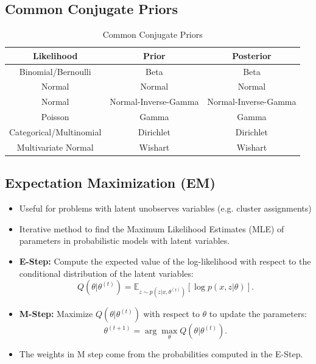 \documentclass[12pt,a4paper]{article}
\begin{document}
\subsection{Common Conjugate Priors}
\begin{table}[h!]
    \centering
    \begin{tabular}{c|c|c}
         Likelihood & Prior & Posterior  \\
         \midrule
         Binomial/Bernoulli & Beta & Beta \\
         Normal & Normal & Normal\\
         Normal & Normal-Inverse-Gamma &Normal-Inverse-Gamma\\
         Poisson &Gamma &Gamma\\
         Categorical/Multinomial & Dirichlet & Dirichlet \\
         Multivariate Normal & Wishart & Wishart \\
    \end{tabular}
    \caption{Common Conjugate Priors}
    \label{tab:my_label}
\end{table}
\subsection{Expectation Maximization (EM)}
\begin{itemize}
    \item Useful for problems with latent unobserves variables (e.g. cluster assignments)
    \item Iterative method to find the Maximum Likelihood Estimates (MLE) of parameters in probabilistic models with latent variables.
    \item \textbf{E-Step:} Compute the expected value of the log-likelihood with respect to the conditional distribution of the latent variables:
    \[ Q(\theta | \theta^{(t)}) = \mathbb{E}_{z \sim p(z|x, \theta^{(t)})}[\log p(x, z | \theta)]. \]
    \item \textbf{M-Step:} Maximize $Q(\theta | \theta^{(t)})$ with respect to $\theta$ to update the parameters:
    \[ \theta^{(t+1)} = \arg\max_{\theta} Q(\theta | \theta^{(t)}). \]
    \item The weights in M step come from the probabilities computed in the E-Step.
\end{itemize}
\end{document}
